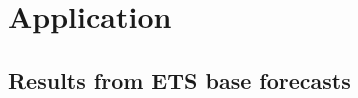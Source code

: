 \documentclass[12pt]{article}
\theoremstyle{definition}
\begin{document}
%
%
%
%
\clearpage
\section{Application}

\subsection{Results from ETS base forecasts}
\end{document}
